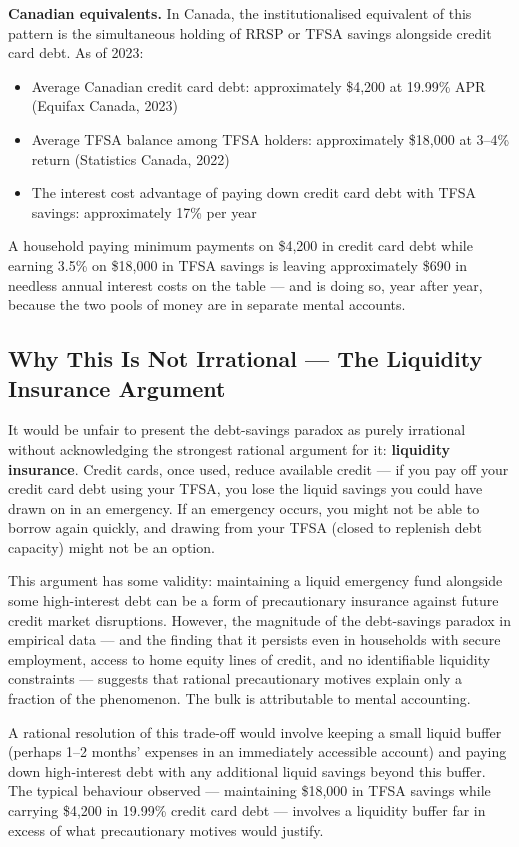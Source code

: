 \documentclass[12pt, letterpaper]{article}
\begin{document}
\textbf{Canadian equivalents.} In Canada, the institutionalised equivalent of this pattern is the simultaneous holding of RRSP or TFSA savings alongside credit card debt. As of 2023:
\begin{itemize}
\item Average Canadian credit card debt: approximately \$4,200 at 19.99\% APR (Equifax Canada, 2023)
\item Average TFSA balance among TFSA holders: approximately \$18,000 at 3--4\% return (Statistics Canada, 2022)
\item The interest cost advantage of paying down credit card debt with TFSA savings: approximately 17\% per year
\end{itemize}

A household paying minimum payments on \$4,200 in credit card debt while earning 3.5\% on \$18,000 in TFSA savings is leaving approximately \$690 in needless annual interest costs on the table --- and is doing so, year after year, because the two pools of money are in separate mental accounts.


\subsection{Why This Is Not Irrational --- The Liquidity Insurance Argument}


It would be unfair to present the debt-savings paradox as purely irrational without acknowledging the strongest rational argument for it: \textbf{liquidity insurance}. Credit cards, once used, reduce available credit --- if you pay off your credit card debt using your TFSA, you lose the liquid savings you could have drawn on in an emergency. If an emergency occurs, you might not be able to borrow again quickly, and drawing from your TFSA (closed to replenish debt capacity) might not be an option.

This argument has some validity: maintaining a liquid emergency fund alongside some high-interest debt can be a form of precautionary insurance against future credit market disruptions. However, the magnitude of the debt-savings paradox in empirical data --- and the finding that it persists even in households with secure employment, access to home equity lines of credit, and no identifiable liquidity constraints --- suggests that rational precautionary motives explain only a fraction of the phenomenon. The bulk is attributable to mental accounting.

A rational resolution of this trade-off would involve keeping a small liquid buffer (perhaps 1--2 months' expenses in an immediately accessible account) and paying down high-interest debt with any additional liquid savings beyond this buffer. The typical behaviour observed --- maintaining \$18,000 in TFSA savings while carrying \$4,200 in 19.99\% credit card debt --- involves a liquidity buffer far in excess of what precautionary motives would justify.
\end{document}
